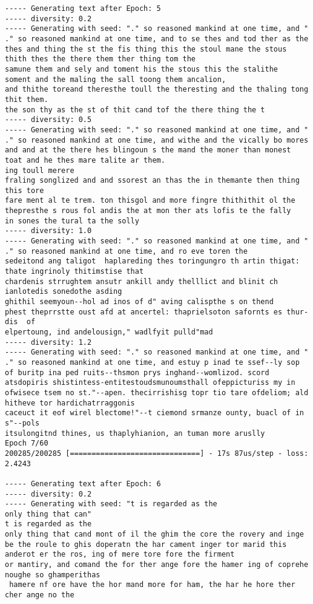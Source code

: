 \documentclass[11pt]{article}
\begin{document}
\begin{Verbatim}[commandchars=\\\{\}]
----- Generating text after Epoch: 5
----- diversity: 0.2
----- Generating with seed: "." so reasoned mankind at one time, and "
." so reasoned mankind at one time, and to se thes and tod ther as the thes and thing the st the fis thing this the stoul mane the stous thith thes the there them ther thing tom the
samune them and sely and toment his the stous this the stalithe
soment and the maling the sall toong them ancalion,
and thithe toreand theresthe toull the theresting and the thaling tong thit them.
the son thy as the st of thit cand tof the there thing the t
----- diversity: 0.5
----- Generating with seed: "." so reasoned mankind at one time, and "
." so reasoned mankind at one time, and withe and the vically bo mores and and at the there hes blingoun s the mand the moner than monest toat and he thes mare talite ar them.
ing toull merere
fraling songlized and and ssorest an thas the in themante then thing this tore
fare ment al te trem. ton thisgol and more fingre thithithit ol the  thepresthe s rous fol andis the at mon ther ats lofis te the fally
in sones the tural ta the solly 
----- diversity: 1.0
----- Generating with seed: "." so reasoned mankind at one time, and "
." so reasoned mankind at one time, and ro eve toren the
sedeitond ang taligot  haplareding thes toringungro th artin thigat: thate ingrinoly thitimstise that
chardenis strrughtem ansutr ankill andy thelllict and blinit ch ianlotedis sonedothe asding
ghithil seemyoun--hol ad inos of d" aving calispthe s on thend
phest theprrstte oust afd at ancertel: thaprielsoton safornts es thur-dis  of
elpertoung, ind andelousign," wadlfyit pulld"mad
----- diversity: 1.2
----- Generating with seed: "." so reasoned mankind at one time, and "
." so reasoned mankind at one time, and estuy p inad te ssef--ly sop of buritp ina ped ruits--thsmon prys inghand--womlizod. scord atsdopiris shistintess-entitestoudsmunoumsthall ofeppicturiss my in ofwisece tsem no st."--apen. thecirrishisg topr tio tare ofdeliom; ald hitheve tor hardichatrraggonis
caceuct it eof wirel blectome!"--t ciemond srmanze ounty, buacl of in s"--pols
itsulongitnd thines, us thaplyhianion, an tuman more aruslly
Epoch 7/60
200285/200285 [==============================] - 17s 87us/step - loss: 2.4243

----- Generating text after Epoch: 6
----- diversity: 0.2
----- Generating with seed: "t is regarded as the
only thing that can"
t is regarded as the
only thing that cand mont of il the ghim the core the rovery and inge be the roule to ghis doperatn the har cament inger tor marid this anderot er the ros, ing of mere tore fore the firment
or mantiry, and comand the for ther ange fore the hamer ing of coprehe noughe so ghamperithas
 hamere nf ore have the hor mand more for ham, the har he hore ther cher ange no the


\end{Verbatim}
\end{document}
